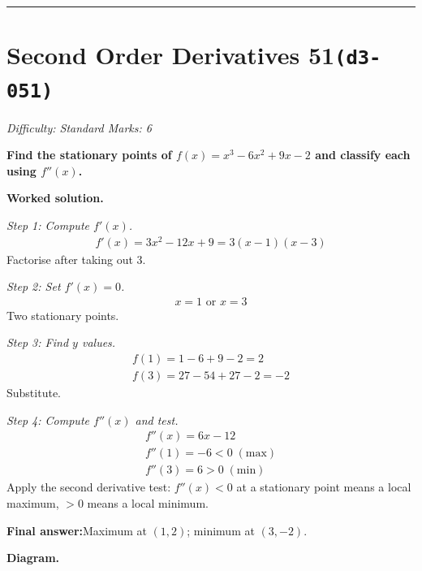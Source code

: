 \documentclass[11pt]{article}
\newcommand{\question}[1]{\par\medskip\noindent\textbf{#1}\par}
\begin{document}
\medskip\hrule

\section*{Second Order Derivatives 51\quad\small\texttt{(d3-051)}}
\textit{Difficulty: Standard \quad\textbar\quad Marks: 6}

\question{Find the stationary points of \( f(x) = x^3 - 6x^2 + 9x - 2 \) and classify each using \( f''(x) \).}

\textbf{Worked solution.}

\textit{Step 1: Compute \( f'(x) \).}
\[\begin{gathered}
f'(x) = 3x^2 - 12x + 9 = 3(x-1)(x-3)
\end{gathered}\]
Factorise after taking out 3.

\textit{Step 2: Set \( f'(x) = 0 \).}
\[\begin{gathered}
x = 1 \text{ or } x = 3
\end{gathered}\]
Two stationary points.

\textit{Step 3: Find \( y \) values.}
\[\begin{gathered}
f(1) = 1 - 6 + 9 - 2 = 2 \\ f(3) = 27 - 54 + 27 - 2 = -2
\end{gathered}\]
Substitute.

\textit{Step 4: Compute \( f''(x) \) and test.}
\[\begin{gathered}
f''(x) = 6x - 12 \\ f''(1) = -6 < 0 \; (\text{max}) \\ f''(3) = 6 > 0 \; (\text{min})
\end{gathered}\]
Apply the second derivative test: \(f''(x) < 0\) at a stationary point means a local maximum, \(> 0\) means a local minimum.

\begin{answerbox}
\textbf{Final answer:}\quad Maximum at \(\displaystyle  (1, 2) \); minimum at \(\displaystyle  (3, -2) \).
\end{answerbox}
\textbf{Diagram.}
\end{document}
